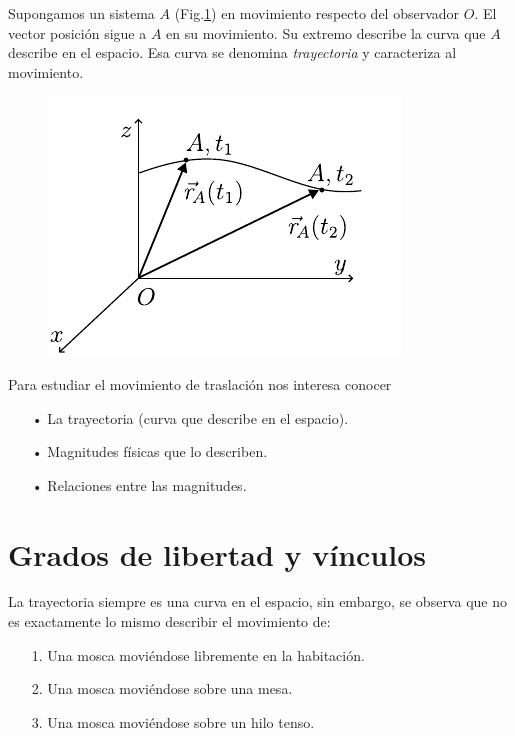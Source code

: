 Supongamos un sistema $A$ (Fig.\ref{fig:1-4}) en movimiento respecto del observador $O$. El vector posición sigue a 
$A$ en su movimiento. Su extremo describe la curva que $A$ describe en el espacio. Esa curva se denomina 
\textit{trayectoria} y caracteriza al movimiento.

\begin{figure}[H]
  \centering
  \includegraphics[]{images/f1-4.pdf}
  \caption{}
  \label{fig:1-4}
\end{figure}


Para estudiar el movimiento de traslación nos interesa conocer
\begin{itemize}[noitemsep]
  \item[•] La trayectoria (curva que describe en el espacio).
  \item[•] Magnitudes físicas que lo describen.
  \item[•] Relaciones entre las magnitudes.
\end{itemize}

\section{Grados de libertad y vínculos}
La trayectoria siempre es una curva en el espacio, sin embargo, se observa que no es exactamente lo mismo describir el 
movimiento de:
\begin{itemize}[noitemsep]
 \item[1.] Una mosca moviéndose libremente en la habitación.
 \item[2.] Una mosca moviéndose sobre una mesa.
 \item[3.] Una mosca moviéndose sobre un hilo tenso.
\end{itemize}

